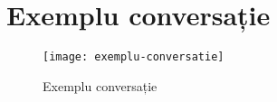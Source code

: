 \chapter{Exemplu conversație}

\label{annex:exempluConversatie}

\begin{figure}[h]
    \centering
    \texttt{[image: exemplu-conversatie]}
    \caption{Exemplu conversație}
    \label{fig:exemplu-request}
\end{figure}